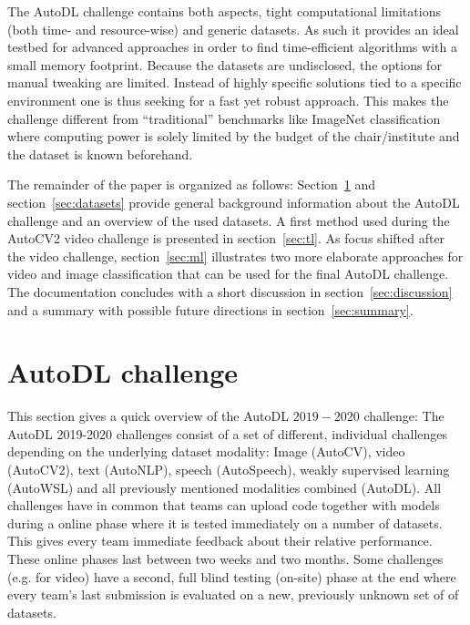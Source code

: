 \documentclass{article}
\begin{document}
The AutoDL challenge contains both aspects, tight computational limitations (both time- and resource-wise) and generic datasets. As such it provides an ideal testbed for advanced approaches in order to find time-efficient algorithms with a small memory footprint. Because the datasets are undisclosed, the options for manual tweaking are limited. Instead of highly specific solutions tied to a specific environment one is thus seeking for a fast yet robust approach. This makes the challenge different from ``traditional'' benchmarks like ImageNet classification where computing power is solely limited by the budget of the chair/institute and the dataset is known beforehand.

The remainder of the paper is organized as follows: Section~\ref{sec:autodl} and section~\ref{sec:datasets} provide general background information about the AutoDL challenge and an overview of the used datasets. A first method used during the AutoCV2 video challenge is presented in section~\ref{sec:tl}. As focus shifted after the video challenge, section~\ref{sec:ml} illustrates two more elaborate approaches for video and image classification that can be used for the final AutoDL challenge. The do\-cumentation concludes with a short discussion in section~\ref{sec:discussion} and a summary with possible future directions in section~\ref{sec:summary}.


\section{AutoDL challenge}
\label{sec:autodl}
This section gives a quick overview of the AutoDL $2019-2020$ challenge: The AutoDL 2019-2020 challenges consist of a set of different, individual challenges depending on the underlying dataset modality: Image (AutoCV), video (AutoCV2), text (AutoNLP), speech (AutoSpeech), weakly supervised learning (AutoWSL) and all previously mentioned modalities combined (AutoDL). 
All challenges have in common that teams can upload code together with models during a online phase where it is tested immediately on a number of datasets. This gives every team immediate feedback about their relative performance. These online phases last between two weeks and two months. Some challenges (e.g. for video) have a second, full blind testing (on-site) phase at the end where every team's last submission is evaluated on a new, previously unknown set of of datasets. 
\end{document}
